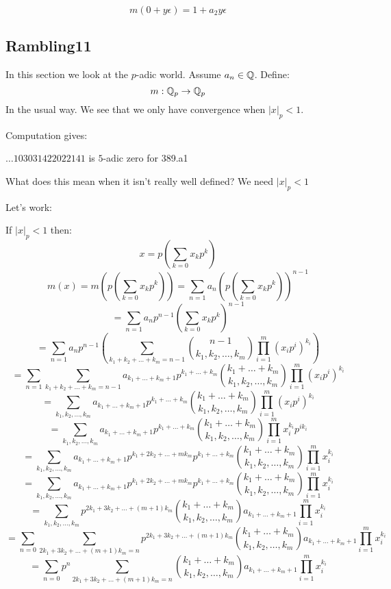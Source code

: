 \documentclass[a4paper]{amsart}
\begin{document}
$$m(0 + y\epsilon) = 1 + a_2y\epsilon$$

\subsection{Rambling11}
In this section we look at the $p$-adic world. Assume $a_n \in \mathbb{Q}$. Define:
$$m : \mathbb{Q}_p \to \mathbb{Q}_p$$
In the usual way. We see that we only have convergence when $|x|_p < 1$. 

Computation gives:

$\ldots103031422022141$ is $5$-adic zero for 389.a1

What does this mean when it isn't really well defined? We need $|x|_p < 1$

Let's work:

If $|x|_p < 1$ then: 
$$x = p(\sum_{k = 0} x_k p^k)$$
$$m(x) = m(p(\sum_{k = 0} x_k p^k)) = \sum_{n = 1} a_n (p(\sum_{k = 0} x_k p^k))^{n - 1}$$
$$ = \sum_{n = 1} a_n p^{n - 1}\left(\sum_{k = 0} x_k p^k\right)^{n - 1}$$
$$ = \sum_{n = 1} a_n p^{n - 1}\left(\sum_{k_1 + k_2 + \ldots + k_m = n - 1} \binom{n - 1}{k_1, k_2, \ldots, k_m} \prod_{i = 1}^m (x_ip^i)^{k_i} \right)$$
$$ = \sum_{n = 1} \sum_{k_1 + k_2 + \ldots + k_m = n - 1} a_{k_1 + \ldots + k_m + 1} p^{k_1 + \ldots + k_m} \binom{k_1 + \ldots + k_m}{k_1, k_2, \ldots, k_m} \prod_{i = 1}^m (x_ip^i)^{k_i}$$
$$ = \sum_{k_1, k_2, \ldots, k_m} a_{k_1 + \ldots + k_m + 1} p^{k_1 + \ldots + k_m} \binom{k_1 + \ldots + k_m}{k_1, k_2, \ldots, k_m} \prod_{i = 1}^m (x_ip^i)^{k_i}$$
$$ = \sum_{k_1, k_2, \ldots, k_m} a_{k_1 + \ldots + k_m + 1} p^{k_1 + \ldots + k_m} \binom{k_1 + \ldots + k_m}{k_1, k_2, \ldots, k_m} \prod_{i = 1}^m x_i^{k_i}p^{ik_i}$$
$$ = \sum_{k_1, k_2, \ldots, k_m} a_{k_1 + \ldots + k_m + 1} p^{k_1 + 2k_2 + \ldots + mk_m} p^{k_1 + \ldots + k_m} \binom{k_1 + \ldots + k_m}{k_1, k_2, \ldots, k_m}  \prod_{i = 1}^m x_i^{k_i}$$
$$ = \sum_{k_1, k_2, \ldots, k_m} a_{k_1 + \ldots + k_m + 1} p^{k_1 + 2k_2 + \ldots + mk_m} p^{k_1 + \ldots + k_m} \binom{k_1 + \ldots + k_m}{k_1, k_2, \ldots, k_m}  \prod_{i = 1}^m x_i^{k_i}$$
$$ = \sum_{k_1, k_2, \ldots, k_m} p^{2k_1 + 3k_2 + \ldots + (m + 1)k_m} \binom{k_1 + \ldots + k_m}{k_1, k_2, \ldots, k_m} a_{k_1 + \ldots + k_m + 1} \prod_{i = 1}^m x_i^{k_i}$$
$$ = \sum_{n = 0} \sum_{2k_1 + 3k_2 + \ldots + (m + 1)k_m = n} p^{2k_1 + 3k_2 + \ldots + (m + 1)k_m} \binom{k_1 + \ldots + k_m}{k_1, k_2, \ldots, k_m} a_{k_1 + \ldots + k_m + 1} \prod_{i = 1}^m x_i^{k_i}$$
$$ = \sum_{n = 0} p^n \sum_{2k_1 + 3k_2 + \ldots + (m + 1)k_m = n} \binom{k_1 + \ldots + k_m}{k_1, k_2, \ldots, k_m} a_{k_1 + \ldots + k_m + 1} \prod_{i = 1}^m x_i^{k_i}$$
\end{document}
